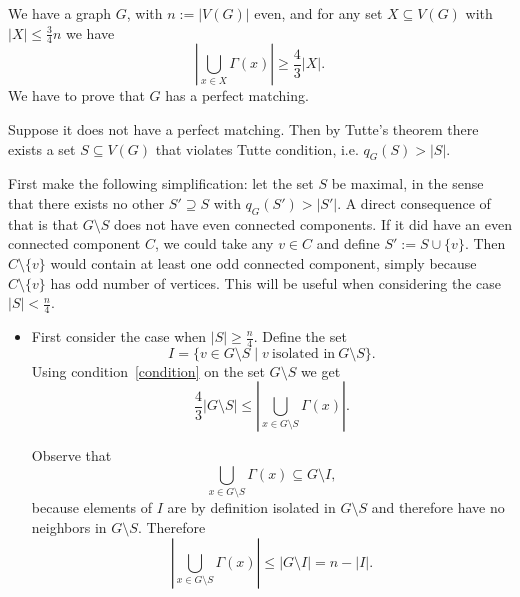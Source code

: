 \begin{exercise}{4}
    We have a graph $G$, with $n := |V(G)|$ even, and for any set $X \subseteq
    V(G)$ with $|X| \leq \frac{3}{4} n$ we have
    \begin{equation}\label{condition}
        \left| \bigcup_{x \in X} \Gamma(x) \right| \geq \frac{4}{3} |X|.
    \end{equation}
    We have to prove that $G$ has a perfect matching.

    Suppose it does not have a perfect matching. Then by Tutte's theorem there
    exists a set $S \subseteq V(G)$ that violates Tutte condition, i.e. $q_G(S)
    > |S|$.

    First make the following simplification: let the set $S$ be maximal, in the
    sense that there exists no other $S' \supseteq S$ with $q_G(S') > |S'|$. A
    direct consequence of that is that $G \setminus S$ does not have even
    connected components. If it did have an even connected component $C$, we
    could take any $v \in C$ and define $S' := S \cup \{v\}$. Then $C \setminus
    \{v\}$ would contain at least one odd connected component, simply because $C
    \setminus \{v\}$ has odd number of vertices. This will be useful when
    considering the case $|S| < \frac{n}{4}$.

    \begin{itemize}
        \item{}
        First consider the case when $|S| \geq \frac{n}{4}$. Define the set
        \[
            I = \{ v \in G \setminus S \mid v\ \text{isolated in}\ G \setminus S \}.
        \]
        Using condition~\ref{condition} on the set $G \setminus S$ we get
        \begin{equation}\label{equation_1}
            \frac{4}{3} |G \setminus S| \leq \left|\bigcup_{x \in G \setminus S} \Gamma(x)
            \right|.
        \end{equation}

        Observe that
        \begin{equation*}
            \bigcup_{x \in G \setminus S} \Gamma(x) \subseteq G \setminus I,
        \end{equation*}
        because elements of $I$ are by definition isolated in $G \setminus S$ and
        therefore have no neighbors in $G \setminus S$. Therefore
        \begin{equation}\label{equation_2}
            \left|\bigcup_{x \in G \setminus S} \Gamma(x) \right| \leq | G \setminus
            I | = n - |I|.
        \end{equation}


\end{itemize}
\end{exercise}
